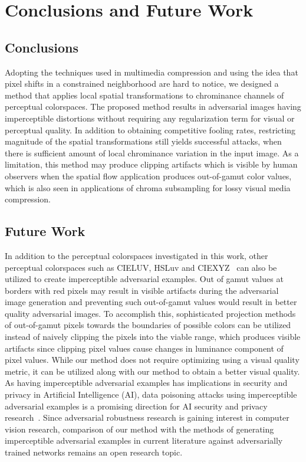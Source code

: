 \chapter{Conclusions and Future Work}
\label{chp:6_conclusion}
\section{Conclusions}
Adopting the techniques used in multimedia compression and using the idea that pixel shifts in a constrained neighborhood are hard to notice, we designed a method that applies local spatial transformations to chrominance channels of perceptual colorspaces. The proposed method results in adversarial images having imperceptible distortions without requiring any regularization term for visual or perceptual quality. In addition to obtaining competitive fooling rates, restricting magnitude of the spatial transformations still yields successful attacks, when there is sufficient amount of local chrominance variation in the input image. As a limitation, this method may produce clipping artifacts which is visible by human observers when the spatial flow application produces out-of-gamut color values, which is also seen in applications of chroma subsampling for lossy visual media compression.


\section{Future Work}
In addition to the perceptual colorspaces investigated in this work, other perceptual colorspaces such as CIELUV, HSLuv and CIEXYZ~\cite{schanda2007colorimetry} can also be utilized to create imperceptible adversarial examples. Out of gamut values at borders with red pixels may result in visible artifacts during the adversarial image generation and preventing such out-of-gamut values would result in better quality adversarial images. To accomplish this, sophisticated projection methods of out-of-gamut pixels towards the boundaries of possible colors can be utilized instead of naively clipping the pixels into the viable range, which produces visible artifacts since clipping pixel values cause changes in luminance component of pixel values. While our method does not require optimizing using a visual quality metric, it can be utilized along with our method to obtain a better visual quality.
As having imperceptible adversarial examples has implications in security and privacy in Artificial Intelligence (AI), data poisoning attacks using imperceptible adversarial examples is a promising direction for AI security and privacy research~\cite{carlini2017towards,ilyas2019adversarial}. Since adversarial robustness research is gaining interest in computer vision research, comparison of our method with the methods of generating imperceptible adversarial examples in current literature against adversarially trained networks remains an open research topic.

